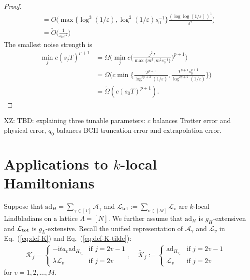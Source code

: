 \documentclass[11pt]{article}
\newcommand{\eq}[1]{(\ref{eq:#1})}
\renewcommand{\i}{\mathrm{i}}
\renewcommand{\L}{\mathcal{L}}
\newcommand{\ad}{\mathrm{ad}}
\newcommand{\A}{\mathcal{A}}
\newcommand{\tot}{\mathrm{tot}}
\newcommand{\eps}{\varepsilon}
\newcommand{\mc}{\mathcal}
\newcommand{\xz}[1]{{\color{cyan} XZ: #1}}
\begin{document}
\begin{proof}
\begin{align*}
        &=O\Big( \max\{\log^3(1/\eps), \log^2(1/\eps)s_0^{-1}\}\frac{(\log\log (1/\eps))^3}{\eps^2}\Big) \\
        &= \widetilde{O}\Big(\frac{1}{s_0\eps^2}\Big)
    \end{align*}
    The smallest noise strength is \begin{align*}
        \min_{j}c(s_jT)^{p+1} &= \Omega\Big(\min_{j}c\Big(\frac{j^2T}{\max\{m^3, m^2s_0^{-1}\}}\Big)^{p+1}\Big) \\
        &=\Omega\Big(c\min\Big\{\frac{T^{p+1}}{\log^{3p+3}(1/\eps)}, \frac{ T^{p+1}s_0^{p+1}}{\log^{2p+2}(1/\eps)}\Big\}\Big)\\
        & = \widetilde{\Omega}(c (s_0 T)^{p+1}).
    \end{align*}
\end{proof}
\xz{TBD: explaining three tunable parameters: $c$ balances Trotter error and physical error, $q_0$ balances BCH truncation error and extrapolation error.}

\section{Applications to $k$-local Hamiltonians}
\label{sec:local}
Suppose that $\ad_H=\sum_{\gamma\in[\Gamma]}\A_\gamma$ and $\mc L_{\tot}:=\sum_{v\in [M]}\mc L_v$ are $k$-local Lindbladians on a lattice $\Lambda = [N]$. We further assume that $\ad_H$ is $g_H$-extensiven and $\L_{\rm tot}$ is $g_L$-extensive.
Recall the unified representation of $\mc A_{\gamma}$ and $\mc L_v$ in Eq.~\eq{def-K} and Eq.~\eq{def-K-tilde}: \begin{align*}
    \mathcal{K}_j = \begin{cases}-\i ta_{v}\ad_{H_{\gamma_v}} & \text{if } j = 2v-1 \\ \lambda\mathcal{L}_v & \text{if } j = 2v \end{cases}, \quad \tilde{\mathcal{K}}_j := \begin{cases}\ad_{H_{\gamma_v}} & \text{if } j = 2v-1\\ \mathcal{L}_v & \text{if } j = 2v \end{cases} 
\end{align*}
for $v=1, 2,\ldots, M$.  
\end{document}
